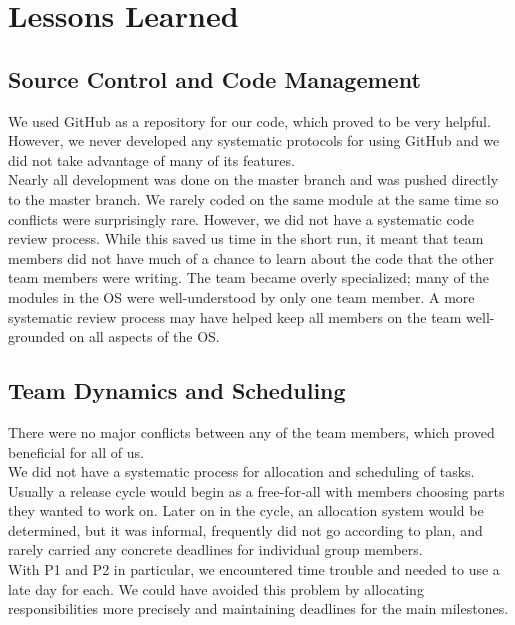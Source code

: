 \documentclass[12pt]{report}
\begin{document}
\chapter{Lessons Learned}

\section{Source Control and Code Management}

We used GitHub as a repository for our code, which proved to be very helpful. However, we never developed any systematic protocols for using GitHub and we did not take advantage of many of its features.\\

Nearly all development was done on the master branch and was pushed directly to the master branch. We rarely coded on the same module at the same time so conflicts were surprisingly rare. However, we did not have a systematic code review process. While this saved us time in the short run, it meant that team members did not have much of a chance to learn about the code that the other team members were writing. The team became overly specialized; many of the modules in the OS were well-understood by only one team member. A more systematic review process may have helped keep all members on the team well-grounded on all aspects of the OS.\\

\section{Team Dynamics and Scheduling}

There were no major conflicts between any of the team members, which proved beneficial for all of us.\\

We did not have a systematic process for allocation and scheduling of tasks. Usually a release cycle would begin as a free-for-all with members choosing parts they wanted to work on. Later on in the cycle, an allocation system would be determined, but it was informal, frequently did not go according to plan, and rarely carried any concrete deadlines for individual group members.\\

With P1 and P2 in particular, we encountered time trouble and needed to use a late day for each. We could have avoided this problem by allocating responsibilities more precisely and maintaining deadlines for the main milestones.\\
\end{document}
